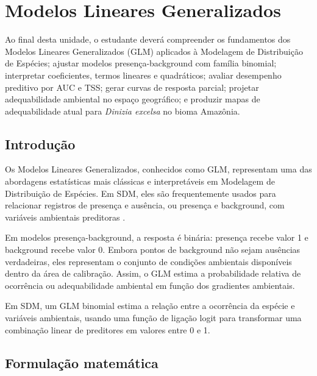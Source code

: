 \chapter[GLM]{Modelos Lineares Generalizados}

\begin{objetivos}
	Ao final desta unidade, o estudante deverá compreender os fundamentos dos Modelos Lineares Generalizados (GLM) aplicados à Modelagem de Distribuição de Espécies; ajustar modelos presença-background com família binomial; interpretar coeficientes, termos lineares e quadráticos; avaliar desempenho preditivo por AUC e TSS; gerar curvas de resposta parcial; projetar adequabilidade ambiental no espaço geográfico; e produzir mapas de adequabilidade atual para \textit{Dinizia excelsa} no bioma Amazônia.
\end{objetivos}

\section{Introdução}

Os Modelos Lineares Generalizados, conhecidos como GLM, representam uma das abordagens estatísticas mais clássicas e interpretáveis em Modelagem de Distribuição de Espécies. Em SDM, eles são frequentemente usados para relacionar registros de presença e ausência, ou presença e background, com variáveis ambientais preditoras \parencite{guisan2000,guisan2005predicting,guisan2017habitat}.

Em modelos presença-background, a resposta é binária: presença recebe valor 1 e background recebe valor 0. Embora pontos de background não sejam ausências verdadeiras, eles representam o conjunto de condições ambientais disponíveis dentro da área de calibração. Assim, o GLM estima a probabilidade relativa de ocorrência ou adequabilidade ambiental em função dos gradientes ambientais.

\begin{conceito}[title={\faBook\quad GLM em SDM}]
	Em SDM, um GLM binomial estima a relação entre a ocorrência da espécie e variáveis ambientais, usando uma função de ligação logit para transformar uma combinação linear de preditores em valores entre 0 e 1.
\end{conceito}

\section{Formulação matemática}

